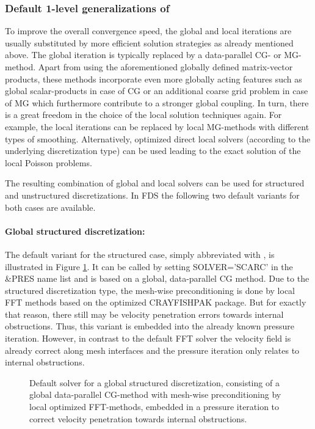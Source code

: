 {\subsubsection{Default 1-level generalizations of \scarc{}}
To improve the overall convergence speed, the global and local iterations are usually substituted by more efficient solution strategies as already mentioned above. The global iteration is typically replaced by a data-parallel CG- or MG-method. Apart from using the aforementioned globally defined matrix-vector products, these methods incorporate even more globally acting features such as global scalar-products in case of CG or an additional coarse grid problem in case of MG which furthermore contribute to a stronger global coupling.
In turn, there is a great freedom in the choice of the local solution techniques again. For example, the local iterations can be replaced by local MG-methods with different types of smoothing. Alternatively, optimized direct local solvers (according to the underlying discretization type) can be used leading to the exact solution of the local Poisson problems.

The resulting combination of global and local solvers can be used for structured and unstructured discretizations. In FDS the following two default variants for both cases are available.

\paragraph {Global structured discretization:}
The default variant for the structured case, simply abbreviated with \scarc{}, is illustrated in Figure \ref{FIG_default_scarc}. It can be called by setting {\ct SOLVER='SCARC'} in the {\ct \&PRES} name list and is based on a global, data-parallel CG method. Due to the structured discretization type, the mesh-wise preconditioning is done by local FFT methods based on the optimized CRAYFISHPAK package. But for exactly that reason, there still may be velocity penetration errors towards internal obstructions. Thus, this variant is  embedded into the already known pressure iteration. However, in contrast to the default FFT solver the velocity field is already correct along mesh interfaces and the pressure iteration only relates to internal obstructions.

\begin{figure}[h]
\begin{center}

\caption{Default \scarc{} solver for a global structured discretization, consisting of a global data-parallel CG-method with mesh-wise preconditioning by local optimized FFT-methods, embedded in a pressure iteration to correct velocity penetration towards internal obstructions.} 
\label{FIG_default_scarc}
\end{center}
\end{figure}

}
